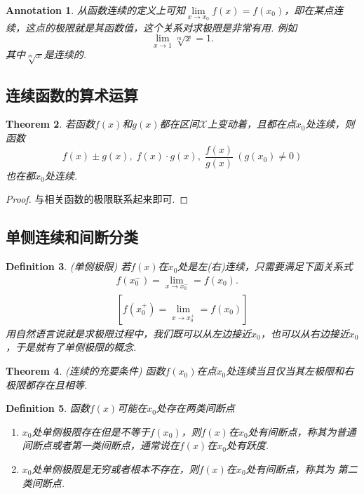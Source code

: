 \documentclass{article}
\newtheorem{theorem}{Theorem}[section]
\newtheorem{definition}[theorem]{Definition}
\newtheorem{annotation}[theorem]{Annotation}
\begin{document}
\begin{annotation}
\rm 从函数连续的定义上可知$\lim\limits_{x \rightarrow x_0}f(x) = f(x_0)$，即在某点连续，这点的极限就是其函数值，这个关系对求极限是非常有用. 例如
$$
\lim\limits_{x \rightarrow 1} \sqrt[m]{x} = 1.
$$
其中$\sqrt[m]{x}$是连续的.
\end{annotation}


\subsection{连续函数的算术运算}

\begin{theorem}
\rm 若函数$f(x)$和$g(x)$都在区间$\mathcal{X}$上变动着，且都在点$x_0$处连续，则函数
$$
f(x) \pm g(x),\; f(x)\cdot g(x), \; \frac{f(x)}{g(x)}~(g(x_0) \neq 0)
$$
也在都$x_0$处连续.
\end{theorem}

\begin{proof}
{\color{blue}与相关函数的极限联系起来即可}.
\end{proof}

\subsection{单侧连续和间断分类}

\begin{definition}
\rm {\color{red} (单侧极限) }若$f(x)$在$x_0$处是左(右)连续，只需要满足下面关系式
$$
\begin{array}{ll}
f(x_0^-) = \lim\limits_{x \rightarrow x_0^-} = f(x_0). \\
\left[ f(x_0^+) = \lim\limits_{x \rightarrow x_0^+} = f(x_0) \right]
\end{array}
$$
{\color{blue}用自然语言说就是求极限过程中，我们既可以从左边接近$x_0$，也可以从右边接近$x_0$，于是就有了单侧极限的概念}.
\end{definition}

\begin{theorem}
\rm {\color{red} (连续的充要条件)} 函数$f(x_0)$在点$x_0$处连续当且仅当其左极限和右极限都存在且相等.
\end{theorem}

\begin{definition}
\rm 函数$f(x)$可能在$x_0$处存在两类间断点
\begin{enumerate}
	\item $x_0$处单侧极限存在但是不等于$f(x_0)$，则$f(x)$在$x_0$处有间断点，称其为{\color{red}普通间断点}或者{\color{red}第一类间断点}，通常说在$f(x)$在$x_0$处有{\color{red}跃度}.
	\item $x_0$处单侧极限是无穷或者根本不存在，则$f(x)$在$x_0$处有间断点，称其为{\color{red} 第二类间断点}.
\end{enumerate}
\end{definition}
\end{document}
